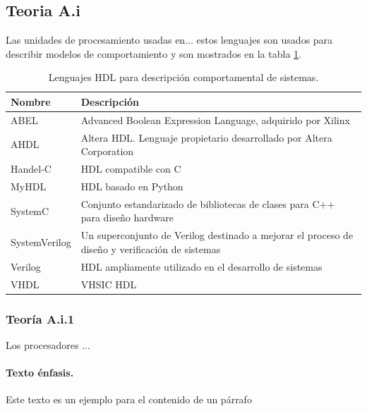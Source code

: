 \subsection{Teoria A.i}
Las unidades de procesamiento usadas en... estos lenguajes son usados para describir modelos de comportamiento y son mostrados en la tabla \ref{tabla_hdls}.

\begin{table}[ht]
\begin{center}
  \begin{tabular}{|l|p{9cm}|}
    \hline
    Nombre		& Descripción \\
    \hline
    ABEL		& Advanced Boolean Expression Language, adquirido por Xilinx \\
    \hline
    AHDL		& Altera HDL. Lenguaje propietario desarrollado por Altera Corporation \\
    \hline
    Handel-C		& HDL compatible con C \\
    \hline
    MyHDL		& HDL basado en Python \\
    \hline
    SystemC		& Conjunto estandarizado de bibliotecas de clases para C++ para diseño hardware \\
    \hline
    SystemVerilog	& Un superconjunto de Verilog destinado a mejorar el proceso de diseño y verificación de sistemas \\
    \hline
    Verilog		& HDL ampliamente utilizado en el desarrollo de sistemas \\
    \hline
    VHDL		& VHSIC HDL \\
    \hline
  \end{tabular}
 \end{center}
 \caption[Lenguajes HDL para descripción comportamental de sistemas]{Lenguajes HDL para descripción comportamental de sistemas.}
 \label{tabla_hdls}
\end{table}


\subsubsection{Teoría A.i.1}
Los procesadores ...

\paragraph{Texto énfasis.} Este texto es un ejemplo para el contenido de un párrafo

